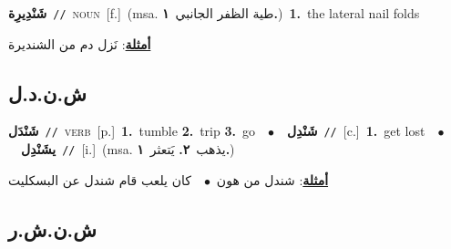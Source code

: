 \documentclass[10pt,a4paper,twoside]{article} %
\begin{document}
\begin{multicols}{2}
{\setlength\topsep{0pt}\textbf{\foreignlanguage{arabic}{شَنْدِيرِة}}\ {\color{gray}\texttt{//}\color{black}}\ \textsc{noun}\ [f.]\ \color{gray}(msa. \foreignlanguage{arabic}{طية الظفر الجانبي}~\foreignlanguage{arabic}{\textbf{١.}})\color{black}\ \textbf{1.}~the lateral nail folds\  \begin{flushright}\color{gray}\foreignlanguage{arabic}{\textbf{\underline{\foreignlanguage{arabic}{أمثلة}}}: نَزل دم من الشنديرة}\end{flushright}\color{black}} \vspace{2mm}

\vspace{-3mm}
\subsection*{\color{blue}\foreignlanguage{arabic}{ش.ن.د.ل}\color{blue}{}} 

{\setlength\topsep{0pt}\textbf{\foreignlanguage{arabic}{شَنْدَل}}\ {\color{gray}\texttt{//}\color{black}}\ \textsc{verb}\ [p.]\ \textbf{1.}~tumble  \textbf{2.}~trip  \textbf{3.}~go\ \ $\bullet$\ \ \setlength\topsep{0pt}\textbf{\foreignlanguage{arabic}{شَنْدِل}}\ {\color{gray}\texttt{//}\color{black}}\ [c.]\ \textbf{1.}~get lost\ \ $\bullet$\ \ \setlength\topsep{0pt}\textbf{\foreignlanguage{arabic}{يشَنْدِل}}\ {\color{gray}\texttt{//}\color{black}}\ [i.]\ \color{gray}(msa. \foreignlanguage{arabic}{يذهب}~\foreignlanguage{arabic}{\textbf{٢.}}  \foreignlanguage{arabic}{يَتعثر}~\foreignlanguage{arabic}{\textbf{١.}})\color{black}\  \begin{flushright}\color{gray}\foreignlanguage{arabic}{\textbf{\underline{\foreignlanguage{arabic}{أمثلة}}}: شندل من هون\ $\bullet$\ \  كان يلعب قام شندل عن البسكليت}\end{flushright}\color{black}} \vspace{2mm}

\vspace{-3mm}
\subsection*{\color{blue}\foreignlanguage{arabic}{ش.ن.ش.ر}\color{blue}{}} 


\end{multicols}
\end{document}
